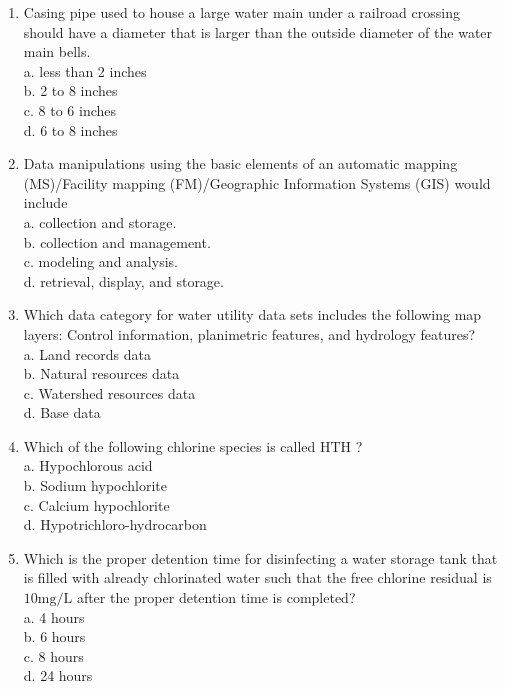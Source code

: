 \documentclass[10pt]{article}
\begin{document}
\begin{enumerate}
  \item Casing pipe used to house a large water main under a railroad crossing should have a diameter that is larger than the outside diameter of the water main bells.\\
a. less than 2 inches\\
b. 2 to 8 inches\\
c. 8 to 6 inches\\
d. 6 to 8 inches

  \item Data manipulations using the basic elements of an automatic mapping (MS)/Facility mapping (FM)/Geographic Information Systems (GIS) would include\\
a. collection and storage.\\
b. collection and management.\\
c. modeling and analysis.\\
d. retrieval, display, and storage.

  \item Which data category for water utility data sets includes the following map layers: Control information, planimetric features, and hydrology features?\\
a. Land records data\\
b. Natural resources data\\
c. Watershed resources data\\
d. Base data

  \item Which of the following chlorine species is called $\mathrm{HTH}$ ?\\
a. Hypochlorous acid\\
b. Sodium hypochlorite\\
c. Calcium hypochlorite\\
d. Hypotrichloro-hydrocarbon

  \item Which is the proper detention time for disinfecting a water storage tank that is filled with already chlorinated water such that the free chlorine residual is $10 \mathrm{mg} / \mathrm{L}$ after the proper detention time is completed?\\
a. 4 hours\\
b. 6 hours\\
c. 8 hours\\
d. 24 hours


\end{enumerate}
\end{document}
